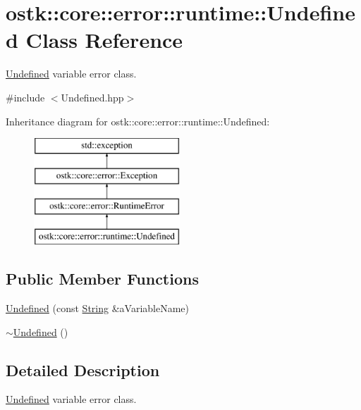 \hypertarget{classostk_1_1core_1_1error_1_1runtime_1_1_undefined}{}\section{ostk\+:\+:core\+:\+:error\+:\+:runtime\+:\+:Undefined Class Reference}
\label{classostk_1_1core_1_1error_1_1runtime_1_1_undefined}


\hyperlink{classostk_1_1core_1_1error_1_1runtime_1_1_undefined}{Undefined} variable error class.  




{\ttfamily \#include $<$Undefined.\+hpp$>$}

Inheritance diagram for ostk\+:\+:core\+:\+:error\+:\+:runtime\+:\+:Undefined\+:\begin{figure}[H]
\begin{center}
\leavevmode
\includegraphics[height=4.000000cm]{classostk_1_1core_1_1error_1_1runtime_1_1_undefined}
\end{center}
\end{figure}
\subsection*{Public Member Functions}
\begin{DoxyCompactItemize}
\item 
\hyperlink{classostk_1_1core_1_1error_1_1runtime_1_1_undefined_a5ae214a1665596b08d53189168827a01}{Undefined} (const \hyperlink{classostk_1_1core_1_1types_1_1_string}{String} \&a\+Variable\+Name)
\item 
\hyperlink{classostk_1_1core_1_1error_1_1runtime_1_1_undefined_a0fd23d55bea868ae30b50f6d2690d6b9}{$\sim$\+Undefined} ()
\end{DoxyCompactItemize}


\subsection{Detailed Description}
\hyperlink{classostk_1_1core_1_1error_1_1runtime_1_1_undefined}{Undefined} variable error class. 

